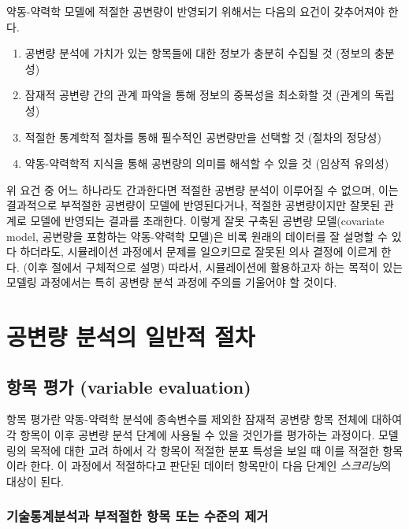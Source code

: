 \documentclass[
  10pt,
]{krantz}
\providecommand{\tightlist}{%
  \setlength{\itemsep}{0pt}\setlength{\parskip}{0pt}}
\begin{document}
약동-약력학 모델에 적절한 공변량이 반영되기 위해서는 다음의 요건이 갖추어져야 한다.

\begin{enumerate}
\def\labelenumi{\arabic{enumi}.}
\tightlist
\item
  공변량 분석에 가치가 있는 항목들에 대한 정보가 충분히 수집될 것 (정보의 충분성)
\item
  잠재적 공변량 간의 관계 파악을 통해 정보의 중복성을 최소화할 것 (관계의 독립성)
\item
  적절한 통계학적 절차를 통해 필수적인 공변량만을 선택할 것 (절차의 정당성)
\item
  약동-약력학적 지식을 통해 공변량의 의미를 해석할 수 있을 것 (임상적 유의성)
\end{enumerate}

위 요건 중 어느 하나라도 간과한다면 적절한 공변량 분석이 이루어질 수 없으며, 이는 결과적으로 부적절한 공변량이 모델에 반영된다거나, 적절한 공변량이지만 잘못된 관계로 모델에 반영되는 결과를 초래한다. 이렇게 잘못 구축된 공변량 모델(covariate model, 공변량을 포함하는 약동-약력학 모델)은 비록 원래의 데이터를 잘 설명할 수 있다 하더라도, 시뮬레이션 과정에서 문제를 일으키므로 잘못된 의사 결정에 이르게 한다. (이후 절에서 구체적으로 설명) 따라서, 시뮬레이션에 활용하고자 하는 목적이 있는 모델링 과정에서는 특히 공변량 분석 과정에 주의를 기울어야 할 것이다.

\hypertarget{uxacf5uxbcc0uxb7c9-uxbd84uxc11duxc758-uxc77cuxbc18uxc801-uxc808uxcc28}{%
\section{공변량 분석의 일반적 절차}\label{uxacf5uxbcc0uxb7c9-uxbd84uxc11duxc758-uxc77cuxbc18uxc801-uxc808uxcc28}}

\hypertarget{uxd56duxbaa9-uxd3c9uxac00-variable-evaluation}{%
\subsection{항목 평가 (variable evaluation)}\label{uxd56duxbaa9-uxd3c9uxac00-variable-evaluation}}

항목 평가란 약동-약력학 분석에 종속변수를 제외한 잠재적 공변량 항목 전체에 대하여 각 항목이 이후 공변량 분석 단계에 사용될 수 있을 것인가를 평가하는 과정이다. 모델링의 목적에 대한 고려 하에서 각 항목이 적절한 분포 특성을 보일 때 이를 적절한 항목이라 한다. 이 과정에서 적절하다고 판단된 데이터 항목만이 다음 단계인 \emph{스크리닝}의 대상이 된다.

\hypertarget{uxae30uxc220uxd1b5uxacc4uxbd84uxc11duxacfc-uxbd80uxc801uxc808uxd55c-uxd56duxbaa9-uxb610uxb294-uxc218uxc900uxc758-uxc81cuxac70}{%
\subsubsection{기술통계분석과 부적절한 항목 또는 수준의 제거}\label{uxae30uxc220uxd1b5uxacc4uxbd84uxc11duxacfc-uxbd80uxc801uxc808uxd55c-uxd56duxbaa9-uxb610uxb294-uxc218uxc900uxc758-uxc81cuxac70}}
\end{document}
